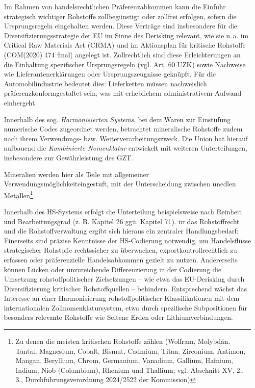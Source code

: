 \documentclass[12pt,a4paper,oneside]{book} %
\begin{document}

Im Rahmen von handelsrechtlichen Präferenzabkommen kann die Einfuhr strategisch wichtiger Rohstoffe zollbegünstigt oder zollfrei erfolgen, sofern die Ursprungsregeln eingehalten werden. Diese Verträge sind insbesondere für die Diversifizierungsstrategie der EU im Sinne des Derisking relevant, wie sie u. a. im Critical Raw Materials Act (CRMA) und im Aktionsplan für kritische Rohstoffe (COM(2020) 474 final) angelegt ist. Zollrechtlich sind diese Erleichterungen an die Einhaltung spezifischer Ursprungsregeln (vgl. Art. 60 UZK) sowie Nachweise wie Lieferantenerklärungen oder Ursprungszeugnisse geknüpft. Für die Automobilindustrie bedeutet dies: Lieferketten müssen nachweislich \glqq präferenzkonform\grqq gestaltet sein, was mit erheblichem administrativem Aufwand einhergeht.

Innerhalb des sog. \textit{Harmonisierten Systems}, bei dem Waren zur Einstufung numerische Codes zugeordnet werden, betrachtet mineralische Rohstoffe zudem nach ihrem Verwendungs- bzw. Weiterverarbeitungszweck. Die Union hat hierauf aufbauend die \textit{Kombinierte Nomenklatur} entwickelt mit weiteren Unterteilungen, insbesondere zur Gewährleistung des GZT. 



Mineralien werden hier als \glqq Teile mit allgemeiner Verwendungsmöglichkeit\grqq eingestuft, mit der Unterscheidung zwischen \glqq unedlen Metallen\grqq\footnote{Zu denen die meisten kritischen Rohstoffe zählen (Wolfram, Molybdän, Tantal, Magnesium, Cobalt, Bismut, Cadmium, Titan, Zirconium, Antimon, Mangan, Beryllium, Chrom, Germanium, Vanadium, Gallium, Hafnium, Indium, Niob (Columbium), Rhenium und Thallium; vgl. Abschnitt XV, 2., 3., Durchführungsverordnung 2024/2522 der Kommission)}

Innerhalb des HS-Systems erfolgt die Unterteilung beispielsweise nach Reinheit und Bearbeitungsgrad (z. B. Kapitel 26 ggü. Kapitel 71). ür das Rohstoffrecht und die Rohstoffverwaltung ergibt sich hieraus ein zentraler Handlungsbedarf: Einerseits sind präzise Kenntnisse der HS-Codierung notwendig, um Handelsflüsse strategischer Rohstoffe rechtssicher zu überwachen, exportkontrollrechtlich zu erfassen oder präferenzielle Handelsabkommen gezielt zu nutzen. Andererseits können Lücken oder unzureichende Differenzierung in der Codierung die Umsetzung rohstoffpolitischer Zielsetzungen – wie etwa das EU-Derisking durch Diversifizierung kritischer Rohstoffquellen – behindern. Entsprechend wächst das Interesse an einer Harmonisierung rohstoffpolitischer Klassifikationen mit dem internationalen Zollnomenklatursystem, etwa durch spezifische Subpositionen für besonders relevante Rohstoffe wie Seltene Erden oder Lithiumverbindungen.
\end{document}
